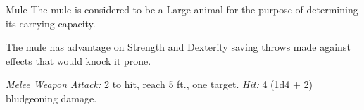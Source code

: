 \documentclass[10pt,a4paper,twoside,bg=print,twocolumn,openany,nodeprecatedcode]{dndbook}
\begin{document}
\begin{DndMonster}[float=t]{Mule}
\DndMonsterBasics[
armor-class = {10},
hit-points = {\DndDice{2d8 + 2}},
speed = {40 ft.}
]
\DndMonsterAbilityScores[
 str = 14,
 dex = 10,
 con = 13,
 int = 2,
 wis = 10,
 cha = 5
]
\DndMonsterDetails[
challenge = 1/8,
]
The mule is considered to be a Large animal for the purpose of determining its carrying capacity.

The mule has advantage on Strength and Dexterity saving throws made against effects that would knock it prone.

\textsl{Melee Weapon Attack:} 2 to hit, reach 5 ft., one target. \textsl{Hit:} 4 (1d4 + 2) bludgeoning damage.

\end{DndMonster}
\end{document}
